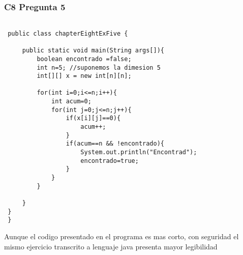 \subsubsection{C8 Pregunta 5}

\lstset{language=JAva}       
 \begin{lstlisting}

 public class chapterEightExFive {
     
     public static void main(String args[]){
         boolean encontrado =false;
         int n=5; //suponemos la dimesion 5
         int[][] x = new int[n][n];
         
         for(int i=0;i<=n;i++){
             int acum=0;
             for(int j=0;j<=n;j++){
                 if(x[i][j]==0){
                     acum++;
                 }
                 if(acum==n && !encontrado){
                     System.out.println("Encontrad");
                     encontrado=true;
                 }
             }      
         }
         
     }
 }
 }
 \end{lstlisting}
 Aunque el codigo presentado en el programa es mas corto, con seguridad el mismo ejercicio transcrito a lenguaje java presenta mayor legibilidad